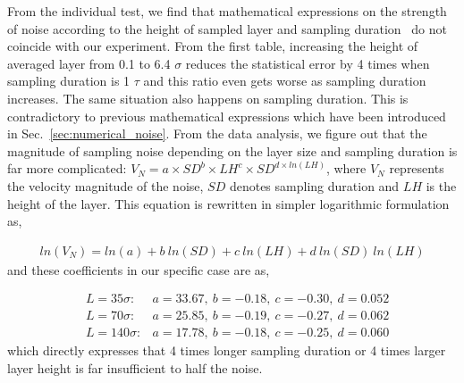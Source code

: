 \documentclass[preprint,12pt]{elsarticle}
\begin{document}
From the individual test, we find that mathematical expressions on the strength of noise according to the height of sampled layer and sampling duration~\cite{Hadjicon3,Time_Mechanism} do not coincide with our experiment. From the first table, increasing the height of averaged layer from 0.1 to 6.4 $\sigma$ reduces the statistical error by 4 times when sampling duration is 1 $\tau$ and this ratio even gets worse as sampling duration increases. The same situation also happens on sampling duration.
This is contradictory to previous mathematical expressions which have been introduced in Sec.~\ref{sec:numerical_noise}.
From the data analysis, we figure out that the magnitude of sampling noise depending on the layer size and sampling duration is far more complicated: $V_{N} = a \times SD^b \times LH^c \times SD^{d \times ln(LH)}$, where $V_N$ represents the velocity magnitude of the noise, $SD$ denotes sampling duration and $LH$ is the height of the layer.
This equation is rewritten in simpler logarithmic formulation as,

\vspace{-.2em}
\footnotesize
\begin{eqnarray}
ln(V_{N}) = ln(a) +b~ ln(SD) +c~ ln(LH) +d~ ln(SD)~ ln(LH)\nonumber
\label{eq:Noise1}
\end{eqnarray}
\normalsize
and these coefficients in our specific case are as,


\vspace{-.2em}
\footnotesize
\begin{eqnarray}
&L = 35 \sigma :   &a = 33.67,~b= - 0.18,~c= - 0.30,~d=0.052\nonumber \\
&L = 70 \sigma :   &a=25.85,~b=- 0.19,~c= - 0.27,~d=0.062\nonumber \\
&L = 140 \sigma : &a=17.78,~b= - 0.18,~c=-0.25,~d=0.060\nonumber
\label{eq:Noise2}
\end{eqnarray}
\normalsize
which directly expresses that 4 times longer sampling duration or 4 times larger layer height is far insufficient to half the noise.
\end{document}
